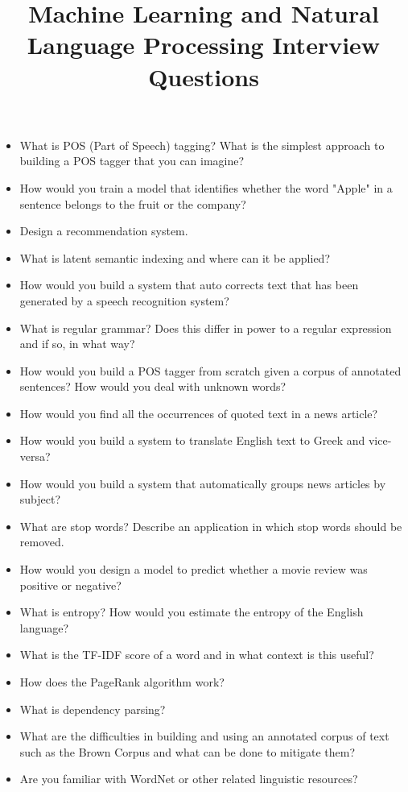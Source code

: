 \documentclass{article}
\begin{document}
\title{Machine Learning and Natural Language Processing Interview Questions}
\maketitle
\begin{itemize}
	\item What is POS (Part of Speech) tagging? What is the simplest approach to building a POS tagger that you can imagine?
	\item How would you train a model that identifies whether the word "Apple" in a sentence belongs to the fruit or the company?
	\item Design a recommendation system.
	\item What is latent semantic indexing and where can it be applied?
	\item How would you build a system that auto corrects text that has been generated by a speech recognition system?
	\item What is regular grammar? Does this differ in power to a regular expression and if so, in what way?
	\item How would you build a POS tagger from scratch given a corpus of annotated sentences? How would you deal with unknown words?
	\item How would you find all the occurrences of quoted text in a news article? 
	\item How would you build a system to translate English text to Greek and vice-versa?
	\item How would you build a system that automatically groups news articles by subject?
	\item What are stop words? Describe an application in which stop words should be removed.
	\item How would you design a model to predict whether a movie review was positive or negative?
	\item What is entropy? How would you estimate the entropy of the English language?
	\item What is the TF-IDF score of a word and in what context is this useful?
	\item How does the PageRank algorithm work?
	\item What is dependency parsing?
	\item What are the difficulties in building and using an annotated corpus of text such as the Brown Corpus and what can be done to mitigate them?
	\item Are you familiar with WordNet or other related linguistic resources?

\end{itemize}
\end{document}

